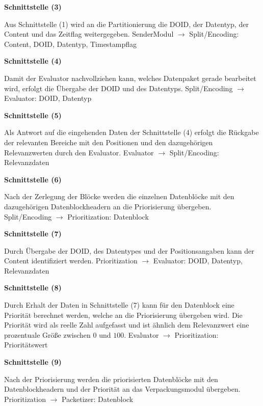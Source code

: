 \textbf{Schnittstelle (3)}

Aus Schnittstelle (1) wird an die Partitionierung
die \gls{DOID}, der Datentyp, der Content und das Zeitflag
weitergegeben.\newline
SenderModul $\rightarrow$ Split/Encoding: Content, \gls{DOID}, Datentyp,
Timestampflag

\textbf{Schnittstelle (4)}

Damit der Evaluator nachvollziehen kann, welches Datenpaket gerade bearbeitet
wird, erfolgt die Übergabe der \gls{DOID} und des Datentyps. \newline
Split/Encoding $\rightarrow$ Evaluator: \gls{DOID}, Datentyp

\textbf{Schnittstelle (5)}

Als Antwort auf die eingehenden Daten der Schnittstelle (4)
erfolgt die Rückgabe der relevanten Bereiche mit den Positionen und den
dazugehörigen Relevanzwerten durch den Evaluator. \newline
Evaluator $\rightarrow$ Split/Encoding: Relevanzdaten   

\textbf{Schnittstelle (6)}

Nach der Zerlegung der Blöcke werden die einzelnen
Datenblöcke mit den dazugehörigen Datenblockheadern an die
Priorisierung übergeben. \newline
Split/Encoding $\rightarrow$ Prioritization: Datenblock

\textbf{Schnittstelle (7)}

Durch Übergabe der \gls{DOID}, des Datentypes und der Positionsangaben kann der
Content identifiziert werden. \newline
Prioritization $\rightarrow$ Evaluator: \gls{DOID}, Datentyp, Relevanzdaten

\textbf{Schnittstelle (8)}

Durch Erhalt der Daten in Schnittstelle (7) kann für
den Datenblock eine Priorität berechnet werden, welche an die Priorisierung übergeben
wird. Die Priorität wird als reelle Zahl aufgefasst und ist ähnlich dem
Relevanzwert eine prozentuale Größe zwischen $0$ und $100$. \newline
Evaluator $\rightarrow$ Prioritization: Prioritätswert

\textbf{Schnittstelle (9)}

Nach der Priorisierung werden die priorisierten Datenblöcke mit den
Datenblockheadern und der Priorität an das Verpackungsmodul übergeben. \newline
Prioritization $\rightarrow$ Packetizer: Datenblock

